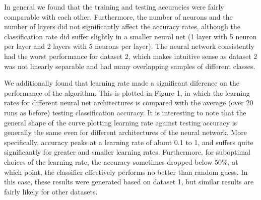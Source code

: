 \documentclass{article}
\begin{document}
In general we found that the training and testing accuracies were fairly comparable with each other. Furthermore, the number of neurons and the number of layers did not significantly affect the accuracy rates, although the classification rate did suffer slightly in a smaller neural net (1 layer with 5 neuron per layer and 2 layers with 5 neurons per layer). The neural network consistently had the worst performance for dataset 2, which makes intuitive sense as dataset 2 was not linearly separable and had many overlapping samples of different classes.

We additionally found that learning rate made a significant diference on the performance of the algorithm. This is plotted in Figure 1, in which the learning rates for different neural net architectures is compared with the average (over 20 runs as before) testing classification accuracy. It is interesting to note that the general shape of the curve plotting learning rate against testing accuracy is generally the same even for different architectures of the neural network. More specifically, accuracy peaks at a learning rate of about 0.1 to 1, and suffers quite significantly for greater and smaller learning rates. Furthermore, for suboptimal choices of the learning rate, the accuracy sometimes dropped below 50\%, at which point, the classifier effectively performs no better than random guess. In this case, these results were generated based on dataset 1, but similar results are fairly likely for other datasets.
\end{document}
